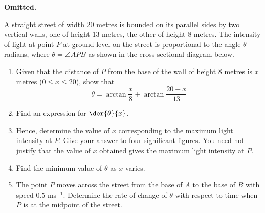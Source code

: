\documentclass{jhwhw}
\begin{document}
    \problem{}
        \textbf{Omitted.}

    \problem{}
        A straight street of width 20 metres is bounded on its parallel sides by two vertical walls, one of height 13 metres, the other of height 8 metres. The intensity of light at point $P$ at ground level on the street is proportional to the angle $\theta$ radians, where $\theta = \angle APB$ as shown in the cross-sectional diagram below.

        \begin{center}
        \end{center}

        \begin{enumerate}
            \item Given that the distance of $P$ from the base of the wall of height 8 metres is $x$ metres ($0 \leq x \leq 20$), show that
            \begin{equation*}
                \theta = \arctan \dfrac{x}8 + \arctan \dfrac{20-x}{13}
            \end{equation*}
            \item Find an expression for $\der{\theta}{x}$.
            \item Hence, determine the value of $x$ corresponding to the maximum light intensity at $P$. Give your answer to four significant figures. You need not justify that the value of $x$ obtained gives the maximum light intensity at $P$.
            \item Find the minimum value of $\theta$ as $x$ varies.
            \item The point $P$ moves across the street from the base of $A$ to the base of $B$ with speed $0.5$ ms$^{-1}$. Determine the rate of change of $\theta$ with respect to time when $P$ is at the midpoint of the street.
        \end{enumerate}
\end{document}
